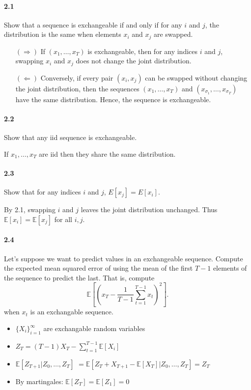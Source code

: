 \documentclass[a4paper]{article}
\begin{document}
\paragraph{2.1}
Show that a sequence is exchangeable if and only if for any $i$ and $j$, the distribution is the same when elements $x_i$ and $x_j$ are swapped.
\begin{itemize}
    \item[$(\Rightarrow)$] If $(x_1,\dots,x_T)$ is exchangeable, then for any indices $i$ and $j$, swapping $x_i$ and $x_j$ does not change the joint distribution.
    \item[$(\Leftarrow)$] Conversely, if every pair $(x_i, x_j)$ can be swapped without changing the joint distribution, then the sequences $(x_1,\dots,x_T)$ and $(x_{\sigma_1},\dots,x_{\sigma_T})$ have the same distribution. Hence, the sequence is exchangeable.
\end{itemize}

\paragraph{2.2}
Show that any iid sequence is exchangeable.

If $x_1,\dots,x_T$ are iid then they share the same distribution.
\paragraph{2.3}
Show that for any indices $i$ and $j$, $E[x_j ] = E[x_i ]$.

By 2.1, swapping $i$ and $j$ leaves the joint distribution unchanged.
Thus $\mathbb{E}[x_i]=\mathbb{E}[x_j]$ for all $i,j$.
\paragraph{2.4}
Let’s suppose we want to predict values in an exchangeable sequence.
Compute the expected mean squared error of using the mean of the first $T - 1$ elements of the sequence to predict the last.
That is, compute
$$\mathbb{E}\left[\left(x_T - \frac{1}{T-1}\sum_{t=1}^{T-1}x_t\right)^2\right].$$
when $x_t$ is an exchangable sequence.

\begin{itemize}
    \item $\{X_i\}_{i=1}^\infty$ are exchangable random variables
    \item $Z_T = (T-1) X_T - \sum_{t=1}^{T-1} \mathbb{E}[X_i]$
    \item $\mathbb{E}[Z_{T+1}| Z_0, \dots, Z_T]$
                        $= \mathbb{E}[Z_T + X_{T+1} - \mathbb{E}[X_T]| Z_0, \dots, Z_T] = Z_T$
    \item By martingales: $\mathbb{E}[Z_T] = \mathbb{E}[Z_1] = 0$
\end{itemize}
\end{document}
